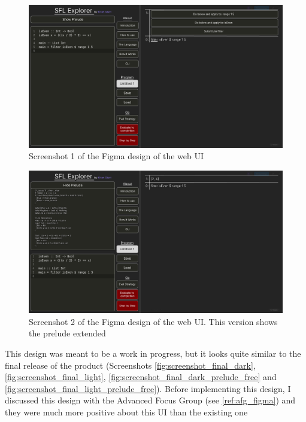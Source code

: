 \begin{figure}[h]
    \centering
    \includegraphics[width=1\linewidth]{images/figma_1.png} 
    \captionsetup{justification=centering}
    \caption{Screenshot 1 of the Figma design of the web UI}
    \label{fig:screenshot_figma1}
\end{figure}

\begin{figure}[h]
    \centering
    \includegraphics[width=1\linewidth]{images/figma_2.png}
    \captionsetup{justification=centering}
    \caption{Screenshot 2 of the Figma design of the web UI. This version shows the prelude extended }
    \label{fig:screenshot_figma2}
\end{figure}

This design was meant to be a work in progress, but it looks quite similar to the final release of the product (Screenshots \ref{fig:screenshot_final_dark}, \ref{fig:screenshot_final_light}, \ref{fig:screenshot_final_dark_prelude_free} and \ref{fig:screenshot_final_light_prelude_free}). Before implementing this design, I discussed this design with the Advanced Focus Group (see \ref{ref:afg_figma}) and they were much more positive about this UI than the existing one 
\\

